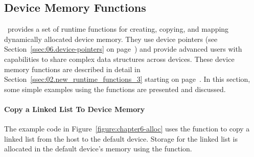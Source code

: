 \subsection{Device Memory Functions}
\label{sec:06.device-memory-routines}

\OMP\ provides a set of runtime functions for creating, copying, and mapping
dynamically allocated device memory.  They use device pointers (see
Section~\ref{ssec:06.device-pointers} on page~\pageref{ssec:06.device-pointers}) and provide advanced users with
capabilities to share complex data structures across devices.  
These device memory functions are described in detail in
Section~\ref{ssec:02.new_runtime_functions_3} starting on
page~\pageref{ssec:02.new_runtime_functions_3}.  
In this section, some simple examples using the functions are presented and discussed.



\paragraph{Copy a Linked List To Device Memory}

The example code in Figure~\ref{figure:chapter6-alloc} uses 
the  function to
copy a linked list from the host to the default device.  Storage for the linked list is allocated
in the default device's memory using the  function.


